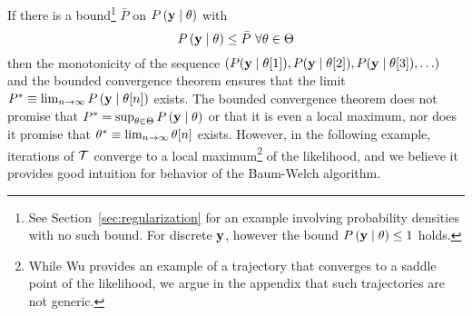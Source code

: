 If there is a bound\footnote{See Section~\ref{sec:regularization} for
  an example involving probability densities with no such bound.  For
  discrete $\mathbf{y}$, however the bound
  $ P \left(\mathbf{y}\mid \theta \right) \leq 1$ holds.}  $\bar P$ on
$ P \left(\mathbf{y}\mid \theta \right) $ with
\begin{equation*}
   P \left(\mathbf{y}\mid \theta \right) \leq \bar P ~ \forall \theta \in \Theta
\end{equation*}
then the monotonicity of the sequence
$\left( P(\mathbf{y}\mid {\theta}{[1]}), P(\mathbf{y}\mid
  {\theta}{[2]}), P(\mathbf{y}\mid {\theta}{[3]}), \ldots
\right)$ and the bounded convergence theorem ensures that the limit
$ P^* \equiv \lim_{n\rightarrow \infty} P \left(\mathbf{y} \mid
  {\theta}{[n]} \right) $ exists.  The bounded convergence
theorem does not promise that
$P^* = \sup_{\theta \in \Theta} P \left(\mathbf{y} \mid \theta
\right)$ or that it is even a local maximum, nor does it promise that
${\theta^*} \equiv \lim_{n \rightarrow \infty} {\theta}{[n]}$
exists.  However, in the following example, iterations of $\EMmap$
converge to a local maximum\footnote{While Wu\cite{Wu83} provides an
  example of a trajectory that converges to a saddle point of the
  likelihood, we argue in the appendix that such trajectories are not
  generic.} of the likelihood, and we believe it provides good
intuition for behavior of the Baum-Welch algorithm.

